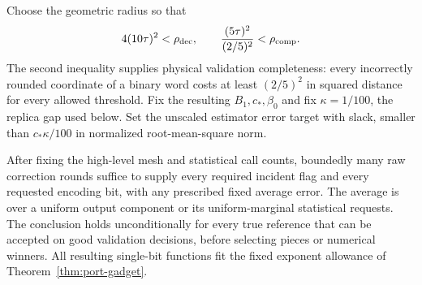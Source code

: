 Choose the geometric radius so that
\begin{equation}\label{out:tau}
 4(10\tau)^2<\rho_{\rm dec},\qquad
 \frac{(5\tau)^2}{(2/5)^2}<\rho_{\rm comp}.
\end{equation}
The second inequality supplies physical validation completeness:
every incorrectly rounded coordinate of a binary word costs at least
$(2/5)^2$ in squared distance for every allowed threshold. Fix the
resulting $B_1,c_*,\beta_0$ and fix $\kappa=1/100$, the replica gap used
below. Set the unscaled estimator error target with slack, smaller than
$c_*\kappa/100$ in normalized root-mean-square norm.

\begin{lemma}
\label{out:average-correction}
After fixing the high-level mesh and statistical call counts, boundedly
many raw correction rounds suffice to supply every required incident
flag and every requested encoding bit, with any prescribed fixed average
error. The average is over a uniform output component or its
uniform-marginal statistical requests. The conclusion holds
unconditionally for every true reference that can be accepted on good
validation decisions, before selecting pieces or numerical winners.
All resulting single-bit functions fit the fixed exponent allowance of
Theorem~\ref{thm:port-gadget}.
\end{lemma}
